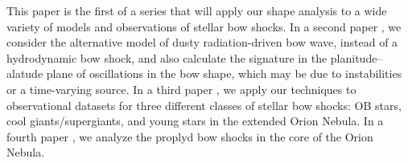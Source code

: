 This paper is the first of a series that will apply our shape analysis
to a wide variety of models and observations of stellar bow shocks.
In a second paper \citep{Henney:2018a}, we consider the alternative
model of dusty radiation-driven bow wave, instead of a hydrodynamic
bow shock, and also calculate the signature in the planitude--alatude
plane of oscillations in the bow shape, which may be due to
instabilities or a time-varying source.  In a third paper
\citep{Henney:2018b}, we apply our techniques to observational
datasets for three different classes of stellar bow shocks: OB stars,
cool giants/supergiants, and young stars in the extended Orion Nebula.
In a fourth paper \citep{Tarango-Yong:2018b}, we analyze the proplyd
bow shocks in the core of the Orion Nebula.



